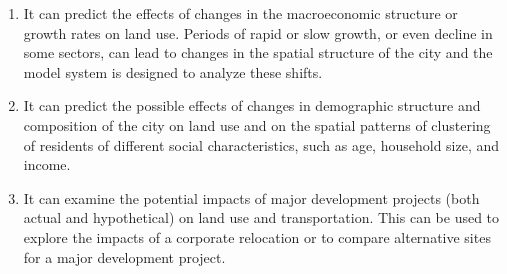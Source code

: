 \begin{enumerate}
\item It can predict the effects of changes in the macroeconomic structure or growth rates on land use. Periods of rapid or slow growth, or even decline in some sectors, can lead to changes in the spatial structure of the city and the model system is designed to analyze these shifts.

\item It can predict the possible effects of changes in demographic structure and composition of the city on land use and on the spatial patterns of clustering of residents of different social characteristics, such as age, household size, and income.

\item It can examine the potential impacts of major development projects (both actual and hypothetical) on land use and transportation. This can be used to explore the impacts of a corporate relocation or to compare alternative sites for a major development project.
\end{enumerate}



    
    
    

